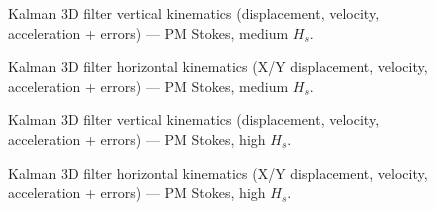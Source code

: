 \documentclass[11pt,letterpaper]{article}
\begin{document}

\begin{figure}[H]\centering
  \resizebox{\textwidth}{!}{}
  \caption{Kalman 3D filter vertical kinematics (displacement, velocity, acceleration + errors) — PM Stokes, medium $H_s$.}
  \label{fig:w3d_pmstokes_medium_zkin}
\end{figure}

\begin{figure}[H]\centering
  \resizebox{\textwidth}{!}{}
  \caption{Kalman 3D filter horizontal kinematics (X/Y displacement, velocity, acceleration + errors) — PM Stokes, medium $H_s$.}
  \label{fig:w3d_pmstokes_medium_xykin}
\end{figure}


\begin{figure}[H]\centering
  \resizebox{\textwidth}{!}{}
  \caption{Kalman 3D filter vertical kinematics (displacement, velocity, acceleration + errors) — PM Stokes, high $H_s$.}
  \label{fig:w3d_pmstokes_high_zkin}
\end{figure}

\begin{figure}[H]\centering
  \resizebox{\textwidth}{!}{}
  \caption{Kalman 3D filter horizontal kinematics (X/Y displacement, velocity, acceleration + errors) — PM Stokes, high $H_s$.}
  \label{fig:w3d_pmstokes_high_xykin}
\end{figure}

\end{document}
